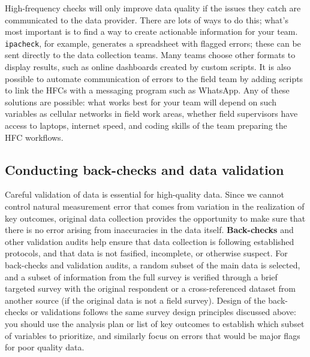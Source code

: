 \begin{fullwidth}
High-frequency checks will only improve data quality
if the issues they catch are communicated to the data provider.
There are lots of ways to do this;
what's most important is to find a way to create actionable information for your team.
\texttt{ipacheck}, for example, generates a spreadsheet with flagged errors;
these can be sent directly to the data collection teams.
Many teams choose other formats to display results,
such as online dashboards created by custom scripts.
It is also possible to automate communication of errors to the field team
by adding scripts to link the HFCs with a messaging program such as WhatsApp.
Any of these solutions are possible:
what works best for your team will depend on such variables as
cellular networks in field work areas, whether field supervisors have access to laptops,
internet speed, and coding skills of the team preparing the HFC workflows.

\subsection{Conducting back-checks and data validation}

Careful validation of data is essential for high-quality data.
Since we cannot control natural measurement error
that comes from variation in the realization of key outcomes,
original data collection provides the opportunity to make sure
that there is no error arising from inaccuracies in the data itself.
\textbf{Back-checks} and
other validation audits help ensure that data collection is following established protocols,
and that data is not fasified, incomplete, or otherwise suspect.
For back-checks and validation audits, a random subset of the main data is selected,
and a subset of information from the full survey is
verified through a brief targeted survey with the original respondent
or a cross-referenced dataset from another source (if the original data is not a field survey).
Design of the back-checks or validations follows the same survey design
principles discussed above: you should use the analysis plan
or list of key outcomes to establish which subset of variables to prioritize,
and similarly focus on errors that would be major flags for poor quality data.


\end{fullwidth}
